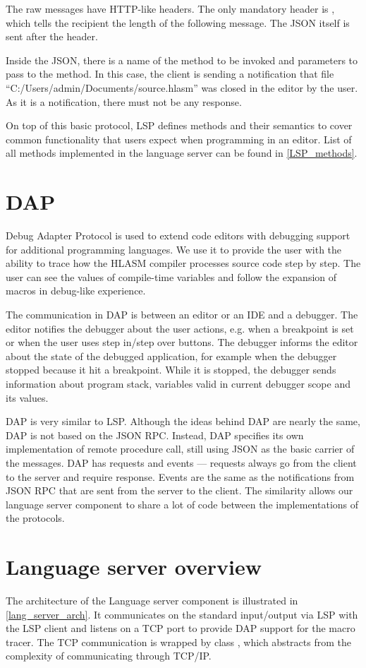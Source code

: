 The raw messages have HTTP-like headers. The only mandatory header is , which tells the recipient the length of the following message. The JSON itself is sent after the header.

Inside the JSON, there is a name of the method to be invoked and parameters to pass to the method. In this case, the client is sending a notification that file ``C:/Users/admin/Documents/source.hlasm'' was closed in the editor by the user. As it is a notification, there must not be any response.

On top of this basic protocol, LSP defines methods and their semantics to cover common functionality that users expect when programming in an editor. List of all methods implemented in the language server can be found in \cref{LSP_methods}.

\section{DAP}
Debug Adapter Protocol is used to extend code editors with debugging support for additional programming languages. We use it to provide the user with the ability to trace how the HLASM compiler processes source code step by step. The user can see the values of compile-time variables and follow the expansion of macros in debug-like experience.

The communication in DAP is between an editor or an IDE and a debugger. The editor notifies the debugger about the user actions, e.g. when a breakpoint is set or when the user uses step in/step over buttons. The debugger informs the editor about the state of the debugged application, for example when the debugger stopped because it hit a breakpoint. While it is stopped, the debugger sends information about program stack, variables valid in current debugger scope and its values.

DAP is very similar to LSP. Although the ideas behind DAP are nearly the same, DAP is not based on the JSON RPC. Instead, DAP specifies its own implementation of remote procedure call, still using JSON as the basic carrier of the messages. DAP has requests and events --- requests always go from the client to the server and require response. Events are the same as the notifications from JSON RPC that are sent from the server to the client. The similarity allows our language server component to share a lot of code between the implementations of the protocols.

\section{Language server overview}
The architecture of the Language server component is illustrated in \cref{lang_server_arch}. It communicates on the standard input/output via LSP with the LSP client and listens on a TCP port to provide DAP support for the macro tracer. The TCP communication is wrapped by class , which abstracts from the complexity of communicating through TCP/IP.


